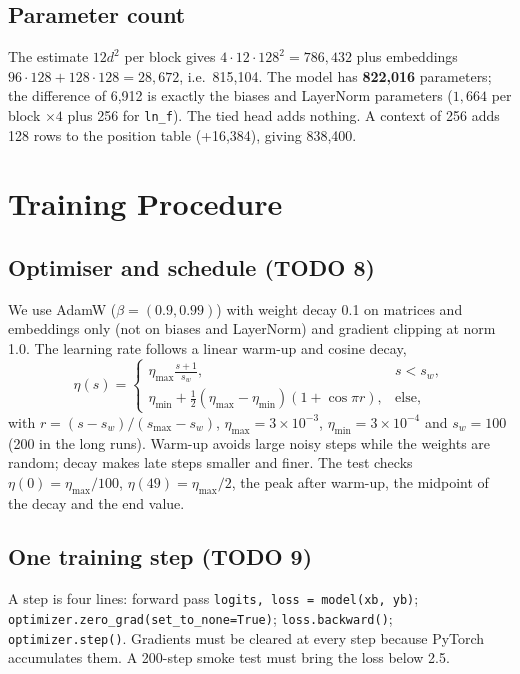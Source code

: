 \documentclass[10pt,twocolumn]{article}
\begin{document}
\subsection{Parameter count}
The estimate $12d^2$ per block gives $4\cdot12\cdot128^2=786{,}432$ plus embeddings $96\cdot128+128\cdot128=28{,}672$, i.e.\ 815,104. The model has \textbf{822,016} parameters; the difference of 6,912 is exactly the biases and LayerNorm parameters ($1{,}664$ per block $\times4$ plus 256 for \texttt{ln\_f}). The tied head adds nothing. A context of 256 adds 128 rows to the position table (+16,384), giving 838,400.

\section{Training Procedure}\label{sec:train}
\subsection{Optimiser and schedule (TODO 8)}
We use AdamW ($\beta=(0.9,0.99)$) \cite{loshchilov2019} with weight decay 0.1 on matrices and embeddings only (not on biases and LayerNorm) and gradient clipping at norm 1.0. The learning rate follows a linear warm-up and cosine decay,
\begin{equation}
\eta(s)=\begin{cases}\eta_{\max}\frac{s+1}{s_w}, & s<s_w,\\[2pt] \eta_{\min}+\tfrac12(\eta_{\max}-\eta_{\min})(1+\cos\pi r), & \text{else},\end{cases}
\end{equation}
with $r=(s-s_w)/(s_{\max}-s_w)$, $\eta_{\max}=3\times10^{-3}$, $\eta_{\min}=3\times10^{-4}$ and $s_w=100$ (200 in the long runs). Warm-up avoids large noisy steps while the weights are random; decay makes late steps smaller and finer. The test checks $\eta(0)=\eta_{\max}/100$, $\eta(49)=\eta_{\max}/2$, the peak after warm-up, the midpoint of the decay and the end value.

\subsection{One training step (TODO 9)}
A step is four lines: forward pass \texttt{logits, loss = model(xb, yb)}; \texttt{optimizer.zero\_grad(set\_to\_none=True)}; \texttt{loss.backward()}; \texttt{optimizer.step()}. Gradients must be cleared at every step because PyTorch accumulates them. A 200-step smoke test must bring the loss below 2.5.
\end{document}
